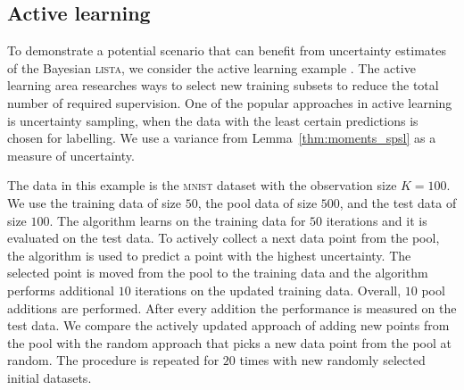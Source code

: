 \documentclass{article}
\begin{document}
\subsection{Active learning}
To demonstrate a potential scenario that can benefit from uncertainty estimates of the Bayesian \textsc{lista}, we consider the active learning example \cite{settles.tr09}. The active learning area researches ways to select new training subsets to reduce the total number of required supervision. One of the popular approaches in active learning is uncertainty sampling, when the data with the least certain predictions is chosen for labelling. We use a variance from Lemma~\ref{thm:moments_spsl} as a measure of uncertainty.

The data in this example is the \textsc{mnist} dataset with the observation size $K=100$. We use the training data of size $50$, the pool data of size $500$,  and the test data of size $100$. The algorithm learns on the training data for $50$ iterations and it is evaluated on the test data. To actively collect a next data point from the pool, the algorithm is used to predict a point with the highest uncertainty. The selected point is moved from the pool to the training data and the algorithm performs additional $10$ iterations on the updated training data. Overall, $10$ pool additions are performed. After every addition the performance is measured on the test data. We compare the actively updated approach of adding new points from the pool with the random approach that picks a new data point from the pool at random. The procedure is repeated for $20$ times with new randomly selected initial datasets.
\end{document}
